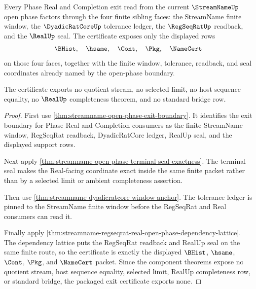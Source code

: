 \begin{theorem}
\label{thm:streamname-real-completion-exit-certificate}
Every Phase Real and Completion exit read from the current $\StreamNameUp$ open phase factors through the four finite sibling faces: the StreamName finite window, the $\DyadicRatCoreUp$ tolerance ledger, the $\RegSeqRatUp$ readback, and the $\RealUp$ seal. The certificate exposes only the displayed rows
$$
\BHist,\quad \hsame,\quad \Cont,\quad \Pkg,\quad \NameCert
$$
on those four faces, together with the finite window, tolerance, readback, and seal coordinates already named by the open-phase boundary.

The certificate exports no quotient stream, no selected limit, no host sequence equality, no $\RealUp$ completeness theorem, and no standard bridge row.
\end{theorem}
\begin{proof}
First use \autoref{thm:streamname-open-phase-exit-boundary}. It identifies the exit boundary for Phase Real and Completion consumers as the finite StreamName window, RegSeqRat readback, DyadicRatCore ledger, RealUp seal, and the displayed support rows.

Next apply \autoref{thm:streamname-open-phase-terminal-seal-exactness}. The terminal seal makes the Real-facing coordinate exact inside the same finite packet rather than by a selected limit or ambient completeness assertion.

Then use \autoref{thm:streamname-dyadicratcore-window-anchor}. The tolerance ledger is pinned to the StreamName finite window before the RegSeqRat and Real consumers can read it.

Finally apply \autoref{thm:streamname-regseqrat-real-open-phase-dependency-lattice}. The dependency lattice puts the RegSeqRat readback and RealUp seal on the same finite route, so the certificate is exactly the displayed $\BHist$, $\hsame$, $\Cont$, $\Pkg$, and $\NameCert$ packet. Since the component theorems expose no quotient stream, host sequence equality, selected limit, RealUp completeness row, or standard bridge, the packaged exit certificate exports none.
\end{proof}

